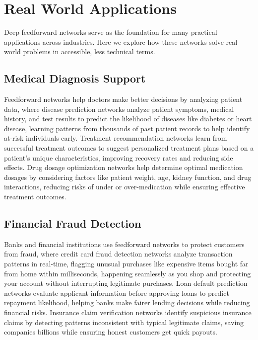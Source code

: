 
\section{Real World Applications}
\label{sec:feedforward-real-world}


Deep feedforward networks serve as the foundation for many practical applications across industries. Here we explore how these networks solve real-world problems in accessible, less technical terms.

\subsection{Medical Diagnosis Support}

Feedforward networks help doctors make better decisions by analyzing patient data, where disease prediction networks analyze patient symptoms, medical history, and test results to predict the likelihood of diseases like diabetes or heart disease, learning patterns from thousands of past patient records to help identify at-risk individuals early. Treatment recommendation networks learn from successful treatment outcomes to suggest personalized treatment plans based on a patient's unique characteristics, improving recovery rates and reducing side effects. Drug dosage optimization networks help determine optimal medication dosages by considering factors like patient weight, age, kidney function, and drug interactions, reducing risks of under or over-medication while ensuring effective treatment outcomes.

\subsection{Financial Fraud Detection}

Banks and financial institutions use feedforward networks to protect customers from fraud, where credit card fraud detection networks analyze transaction patterns in real-time, flagging unusual purchases like expensive items bought far from home within milliseconds, happening seamlessly as you shop and protecting your account without interrupting legitimate purchases. Loan default prediction networks evaluate applicant information before approving loans to predict repayment likelihood, helping banks make fairer lending decisions while reducing financial risks. Insurance claim verification networks identify suspicious insurance claims by detecting patterns inconsistent with typical legitimate claims, saving companies billions while ensuring honest customers get quick payouts.

